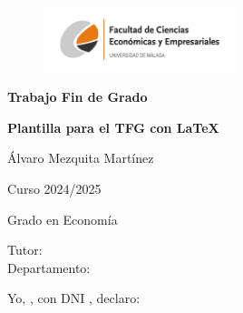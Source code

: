 \documentclass[13pt,a4paper]{report}
\numberwithin{figure}{section} %
\numberwithin{table}{section} %
\begin{document}
\begin{titlepage}
    \centering 
    \begin{figure}[h!]
        \centering
        \includegraphics[width=0.5\textwidth]{logo.png}
    \end{figure}
    
    \vspace*{1cm} 
    \Huge
    \textbf{Trabajo Fin de Grado}
    \vspace*{1cm}
    
    \Huge
    
    \textbf{Plantilla para el TFG con \LaTeX}
    
    \vspace{0.5cm}
    \LARGE 
    Álvaro Mezquita Martínez
    \vspace{0.5cm} 

    Curso 2024/2025
        
    \vspace{0.5cm}

    Grado en Economía
    
    \vfill

    \raggedleft     
    Tutor:  \makebox[5cm]{\dotfill} %
    \\
    Departamento:  \makebox[5cm]{\dotfill} %
    
    \vspace{5cm}
\end{titlepage}


\newpage
\thispagestyle{empty} %

\vspace{12pt}

Yo, \makebox[2cm]{\dotfill}, con DNI  \makebox[2cm]{\dotfill}, declaro:  %

\vspace{12pt}
\end{document}
